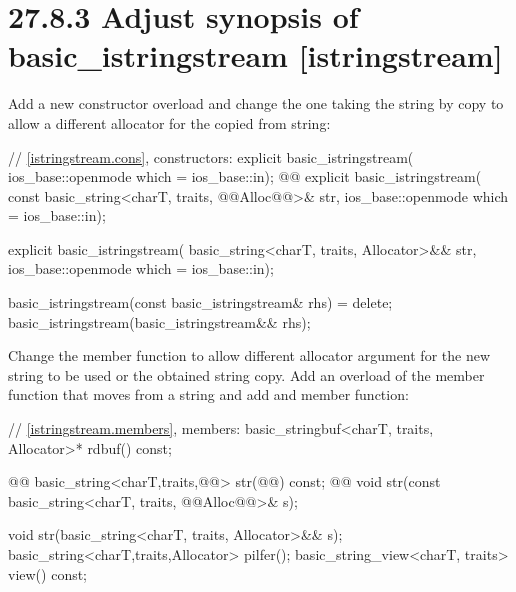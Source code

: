 \documentclass[ebook,11pt,article]{memoir}
\begin{document}
\section{27.8.3 Adjust synopsis of basic\_istringstream [istringstream]}
Add a new constructor overload and change the one taking the string by copy to allow a different allocator for the copied from string:
\begin{codeblock}
    // \ref{istringstream.cons}, constructors:
    explicit basic_istringstream(
      ios_base::openmode which = ios_base::in);
    @@
    explicit basic_istringstream(
      const basic_string<charT, traits, @@Alloc@@>& str,
      ios_base::openmode which = ios_base::in);
\end{codeblock}
\begin{addedblock}
\begin{codeblock}
    explicit basic_istringstream(
      basic_string<charT, traits, Allocator>&& str,
      ios_base::openmode which = ios_base::in);
\end{codeblock}
\end{addedblock}
\begin{codeblock}
    basic_istringstream(const basic_istringstream& rhs) = delete;
    basic_istringstream(basic_istringstream&& rhs);
\end{codeblock}

Change the  member function to allow different allocator argument for the new string to be used or the obtained string copy.
Add an overload of the  member function that moves from a string and add  and  member function:

\begin{codeblock}
    // \ref{istringstream.members}, members:
    basic_stringbuf<charT, traits, Allocator>* rdbuf() const;

    @@
    basic_string<charT,traits,@@> str(@@) const;
    @@
    void str(const basic_string<charT, traits, @@Alloc@@>& s);
\end{codeblock}
\begin{addedblock}
\begin{codeblock}
    void str(basic_string<charT, traits, Allocator>&& s);
    basic_string<charT,traits,Allocator> pilfer();
    basic_string_view<charT, traits> view() const;
\end{codeblock}
\end{addedblock}
\end{document}
